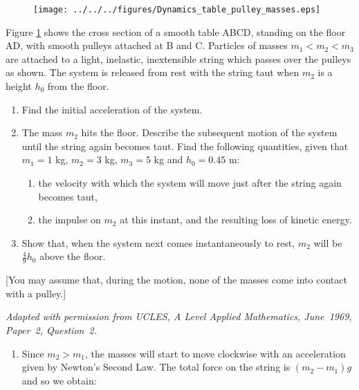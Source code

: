 
\begin{problem}[A1969AMIIQ2a] %
{\begin{figure}[h]
\centering
\texttt{[image: ../../../figures/Dynamics\_table\_pulley\_masses.eps]}
\caption{}\label{fig:Dynamics_table_pulley_masses}
\end{figure}

Figure \ref{fig:Dynamics_table_pulley_masses} shows the cross section of a smooth table ABCD, standing on the floor AD, with smooth pulleys attached at B and C. Particles of masses $m_{1} < m_{2} < m_{3}$ are attached to a light, inelastic, inextensible string which passes over the pulleys as shown. The system is released from rest with the string taut when $m_{2}$ is a height $h_{0}$ from the floor.
\begin{enumerate}
	\item Find the initial acceleration of the system.
	\item The mass $m_{2}$ hits the floor. Describe the subsequent motion of the system until the string again becomes taut. Find the following quantities, given that $m_{1} = 1$ kg, $m_{2} = 3$ kg, $m_{3} = 5$ kg and $h_{0} = 0.45$ m:
	\begin{enumerate}
		\item the velocity with which the system will move just after the string again becomes taut,
		\item the impulse on $m_{2}$ at this instant, and the resulting loss of kinetic energy.
	\end{enumerate}
	\item Show that, when the system next comes instantaneously to rest, $m_{2}$ will be $\frac{4}{9}h_{0}$ above the floor.
\end{enumerate}
[You may assume that, during the motion, none of the masses come into contact with a pulley.]
}
{\textit{Adapted with permission from UCLES, A Level Applied Mathematics, June~1969, Paper~2, Question~2.}}
{\begin{enumerate}
	\item Since $m_{2} > m_{1}$, the masses will start to move clockwise with an acceleration given by Newton's Second Law. The total force on the string is $(m_{2} - m_{1})g$ and so we obtain:

\end{enumerate}}
\end{problem}

